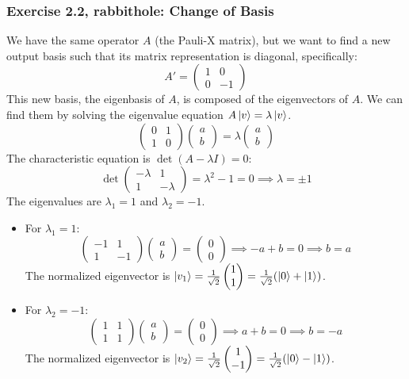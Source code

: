 \documentclass{article}
\begin{document}
\subsubsection*{Exercise 2.2, rabbithole: Change of Basis}
We have the same operator $A$ (the Pauli-X matrix), but we want to find a new output basis such that its matrix representation is diagonal, specifically:
$$ A' = \begin{pmatrix} 1 & 0 \\ 0 & -1 \end{pmatrix} $$
This new basis, the eigenbasis of $A$, is composed of the eigenvectors of $A$. We can find them by solving the eigenvalue equation $A\ket{v} = \lambda\ket{v}$.
$$ \begin{pmatrix} 0 & 1 \\ 1 & 0 \end{pmatrix} \begin{pmatrix} a \\ b \end{pmatrix} = \lambda \begin{pmatrix} a \\ b \end{pmatrix} $$
The characteristic equation is $\det(A - \lambda I) = 0$:
$$ \det \begin{pmatrix} -\lambda & 1 \\ 1 & -\lambda \end{pmatrix} = \lambda^2 - 1 = 0 \implies \lambda = \pm 1 $$
The eigenvalues are $\lambda_1 = 1$ and $\lambda_2 = -1$.
\begin{itemize}
    \item For $\lambda_1 = 1$:
    $$ \begin{pmatrix} -1 & 1 \\ 1 & -1 \end{pmatrix} \begin{pmatrix} a \\ b \end{pmatrix} = \begin{pmatrix} 0 \\ 0 \end{pmatrix} \implies -a+b=0 \implies b=a $$
    The normalized eigenvector is $\ket{v_1} = \frac{1}{\sqrt{2}}\begin{pmatrix} 1 \\ 1 \end{pmatrix} = \frac{1}{\sqrt{2}}(\ket{0} + \ket{1})$.
    \item For $\lambda_2 = -1$:
    $$ \begin{pmatrix} 1 & 1 \\ 1 & 1 \end{pmatrix} \begin{pmatrix} a \\ b \end{pmatrix} = \begin{pmatrix} 0 \\ 0 \end{pmatrix} \implies a+b=0 \implies b=-a $$
    The normalized eigenvector is $\ket{v_2} = \frac{1}{\sqrt{2}}\begin{pmatrix} 1 \\ -1 \end{pmatrix} = \frac{1}{\sqrt{2}}(\ket{0} - \ket{1})$.
\end{itemize}
\end{document}
